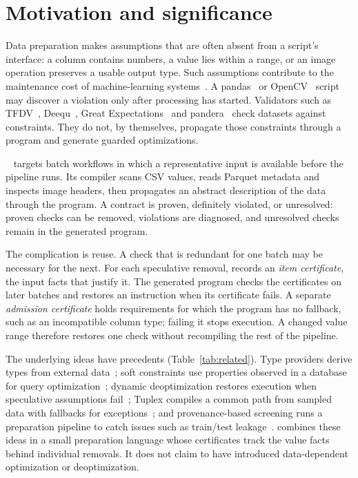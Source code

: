 \section{Motivation and significance}

Data preparation makes assumptions that are often absent from a script's interface: a column contains
numbers, a value lies within a range, or an image operation preserves a usable output type. Such
assumptions contribute to the maintenance cost of machine-learning systems~\cite{sculley2015}.
A pandas~\cite{mckinney2010} or OpenCV~\cite{bradski2000} script may discover a violation only after
processing has started. Validators such as TFDV~\cite{breck2019}, Deequ~\cite{schelter2018}, Great
Expectations~\cite{gx} and pandera~\cite{bantilan2020} check datasets against constraints. They do not,
by themselves, propagate those constraints through a program and generate guarded optimizations.

\PL~\cite{preplang2026} targets batch workflows in which a representative input is available before the
pipeline runs. Its compiler scans CSV values, reads Parquet metadata and inspects image headers, then
propagates an abstract description of the data through the program. A contract is proven, definitely
violated, or unresolved: proven checks can be removed, violations are diagnosed, and unresolved checks
remain in the generated program.

The complication is reuse. A check that is redundant for one batch may be necessary for the next.
For each speculative removal, \PL records an \emph{item certificate}, the input facts that justify it.
The generated program checks the certificates on later batches and restores an instruction when its
certificate fails. A separate \emph{admission certificate} holds requirements for which the program has
no fallback, such as an incompatible column type; failing it stops execution. A changed value range
therefore restores one check without recompiling the rest of the pipeline.

The underlying ideas have precedents (Table~\ref{tab:related}). Type providers derive types from external
data~\cite{petricek2016}; soft constraints use properties observed in a database for query
optimization~\cite{godfrey2001}; dynamic deoptimization restores execution when speculative assumptions
fail~\cite{holzle1992,barriere2021}; Tuplex compiles a common path from sampled data with fallbacks for
exceptions~\cite{spiegelberg2021}; and provenance-based screening runs a preparation pipeline to catch
issues such as train/test leakage~\cite{schelter2024screening}. \PL combines these ideas in a small
preparation language whose certificates track the value facts behind individual removals. It does not
claim to have introduced data-dependent optimization or deoptimization.

